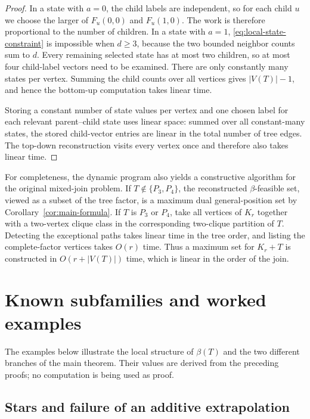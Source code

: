 \documentclass[preprint,12pt]{elsarticle}
\numberwithin{equation}{section}
\begin{document}
\begin{proof}
In a state with \(a=0\), the child labels are
independent, so for each child \(u\) we choose the larger of
\(F_u(0,0)\) and \(F_u(1,0)\). The work is therefore proportional to the
number of children. In a state with \(a=1\), \eqref{eq:local-state-constraint} is impossible when
\(d\ge 3\), because the two bounded neighbor counts sum to \(d\). Every
remaining selected state has at most two children, so at most four
child-label vectors need to be examined. There are only constantly many
states per vertex. Summing the child counts over all vertices gives
\(|V(T)|-1\), and hence the bottom-up computation takes linear time.

Storing a constant number of state values per vertex and one chosen
label for each relevant parent--child state uses linear space: summed
over all constant-many states, the stored child-vector entries are
linear in the total number of tree edges. The
top-down reconstruction visits every vertex once and therefore also
takes linear time.
\end{proof}

For completeness, the dynamic program also yields a constructive algorithm
for the original mixed-join problem. If \(T\notin\{P_3,P_4\}\), the
reconstructed \(\beta\)-feasible set, viewed as a subset of the tree factor,
is a maximum dual general-position set by
Corollary~\ref{cor:main-formula}. If \(T\) is \(P_3\) or \(P_4\),
take all vertices of \(K_r\) together with a two-vertex clique class in the
corresponding two-clique partition of \(T\). Detecting the exceptional paths
takes linear time in the tree order, and listing the complete-factor vertices
takes \(O(r)\) time. Thus a maximum set for \(K_r+T\) is constructed in
\(O(r+|V(T)|)\) time, which is linear in the order of the join.

\section{Known subfamilies and worked examples}\label{sec:examples}

The examples below illustrate the local structure of \(\beta(T)\) and
the two different branches of the main theorem. Their values are derived
from the preceding proofs; no computation is being used as proof.

\subsection{Stars and failure of an additive extrapolation}\label{sec:stars}
\end{document}
